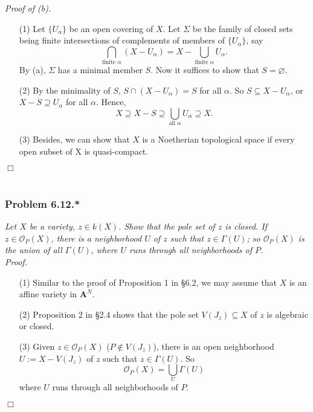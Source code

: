 \documentclass{article}
\begin{document}
\emph{Proof of (b).}
\begin{enumerate}
\item[(1)]
  Let $\{ U_{\alpha} \}$ be an open covering of $X$.
  Let $\Sigma$ be the family of closed sets being finite intersections of
  complements of members of $\{ U_{\alpha} \}$, say
  \[
    \bigcap_{\text{finite }\alpha} (X - U_{\alpha})
    = X - \bigcup_{\text{finite }\alpha} U_{\alpha}.
  \]
  By (a), $\Sigma$ has a minimal member $S$.
  Now it suffices to show that $S = \varnothing$.

\item[(2)]
  By the minimality of $S$,
  $S \cap (X - U_{\alpha}) = S$ for all $\alpha$.
  So $S \subseteq X - U_{\alpha}$, or $X - S \supseteq U_{\alpha}$ for all $\alpha$.
  Hence,
  \[
    X
    \supseteq X - S
    \supseteq \bigcup_{\text{all } \alpha} U_{\alpha}
    \supseteq X.
  \]

\item[(3)]
  Besides, we can show that $X$ is a Noetherian topological space
  if every open subset of X is quasi-compact.
\end{enumerate}
$\Box$ \\\\






\subsubsection*{Problem 6.12.*}
\emph{Let $X$ be a variety, $z \in k(X)$.
Show that the pole set of $z$ is closed.
If $z \in \mathscr{O}_P(X)$, there is a neighborhood $U$ of $z$ such that $z \in \Gamma(U)$;
so $\mathscr{O}_P(X)$ is the union of all $\Gamma(U)$,
where $U$ runs through all neighborhoods of $P$.} \\



\emph{Proof.}
\begin{enumerate}
\item[(1)]
  Similar to the proof of Proposition 1 in \S 6.2,
  we may assume that $X$ is an affine variety in $\mathbf{A}^{N}$.

\item[(2)]
  Proposition 2 in \S 2.4 shows that
  the pole set $V(J_z) \subseteq X$ of $z$ is algebraic or closed.

\item[(3)]
  Given $z \in \mathscr{O}_P(X)$ ($P \not\in V(J_z)$),
  there is an open neighborhood $U := X - V(J_z)$ of $z$ such that $z \in \Gamma(U)$.
  So
  \[
    \mathscr{O}_P(X) = \bigcup_{U} \Gamma(U)
  \]
  where $U$ runs through all neighborhoods of $P$.
\end{enumerate}
$\Box$ \\\\
\end{document}
